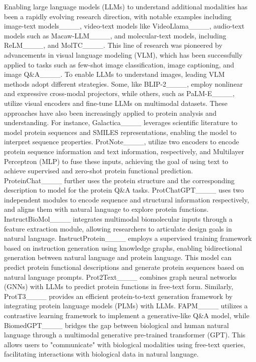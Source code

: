 Enabling large language models (LLMs) to understand additional modalities has been a rapidly evolving research direction, with notable examples including image-text models____, video-text models like VideoLlama____, audio-text models such as Macaw-LLM____, and molecular-text models, including ReLM____, and MolTC____. This line of research was pioneered by advancements in visual language modeling (VLM), which has been successfully applied to tasks such as few-shot image classification, image captioning, and image Q\&A____.
To enable LLMs to understand images, leading VLM methods adopt different strategies. Some, like BLIP-2____, employ nonlinear and expressive cross-modal projectors, while others, such as PaLM-E____, utilize visual encoders and fine-tune LLMs on multimodal datasets. These approaches have also been increasingly applied to protein analysis and understanding. For instance, Galactica____ leverages scientific literature to model protein sequences and SMILES representations, enabling the model to interpret sequence properties. 
ProtNote____, utilize two encoders to encode protein sequence information and text information, respectively, and Multilayer Perceptron (MLP) to fuse these inputs, achieving the goal of using text to achieve supervised and zero-shot protein functional prediction. 
ProteinChat____ further uses the protein structure and the corresponding description to model for the protein Q\&A tasks.
ProtChatGPT____ uses two independent modules to encode sequence and structural information respectively, and aligns them with natural language to explore protein functions. 
InstructBioMol____ integrates multimodal biomolecular inputs through a feature extraction module, allowing researchers to articulate design goals in natural language. 
InstructProtein____ employs a supervised training framework based on instruction generation using knowledge graphs, enabling bidirectional generation between natural language and protein language. This model can predict protein functional descriptions and generate protein sequences based on natural language prompts. Prot2Text____ combines graph neural networks (GNNs) with LLMs to predict protein functions in free-text form. Similarly, ProtT3____ provides an efficient protein-to-text generation framework by integrating protein language models (PLMs) with LLMs. FAPM____ utilizes a contrastive learning framework to implement a generative-like Q\&A model, while BiomedGPT____ bridges the gap between biological and human natural language through a multimodal generative pre-trained transformer (GPT). This allows users to "communicate" with biological modalities using free-text queries, facilitating interactions with biological data in natural language. 



